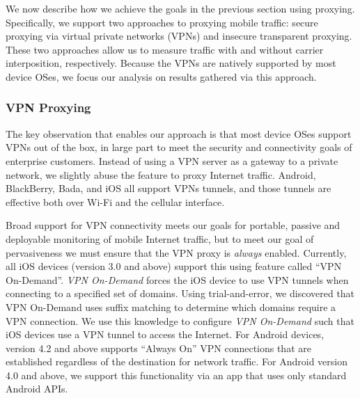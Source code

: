 We now describe how we achieve the goals in the previous section using proxying. Specifically, we support two approaches to proxying mobile traffic: secure proxying via virtual private networks (VPNs) and insecure transparent proxying. These two approaches allow us to measure traffic with and without carrier interposition, respectively. Because the VPNs are natively supported by most device OSes, we focus our analysis on results gathered via this approach.  

\subsubsection{VPN Proxying} 

The key observation that enables our approach is that most device OSes support VPNs out of the box, in large part to 
meet the security and connectivity goals of enterprise customers. Instead of using a VPN server as a gateway to 
a private network, we slightly abuse the feature to proxy Internet traffic. Android, BlackBerry, Bada, and iOS all support VPNs tunnels, and those tunnels are 
effective both over Wi-Fi and the cellular interface. 

Broad support for VPN connectivity meets our goals for portable, passive and deployable monitoring of 
mobile Internet traffic, but to meet our goal of pervasiveness we must ensure that the VPN proxy is \emph{always} enabled. 
Currently, all iOS devices (version 3.0 and above) support this using feature called ``VPN On-Demand''. \emph{VPN On-Demand} forces the iOS device to use VPN tunnels when connecting to a specified set of domains. 
Using trial-and-error, we discovered that VPN On-Demand uses suffix matching to determine which domains require a VPN connection. 
We use this knowledge to configure \emph{VPN On-Demand} such that iOS devices use a VPN tunnel to access the Internet. 
For Android devices, version 4.2 and above supports ``Always On'' VPN connections that are established regardless of the destination for network traffic. For Android version 4.0 and above, we support 
this functionality via an app that uses only standard Android APIs.


